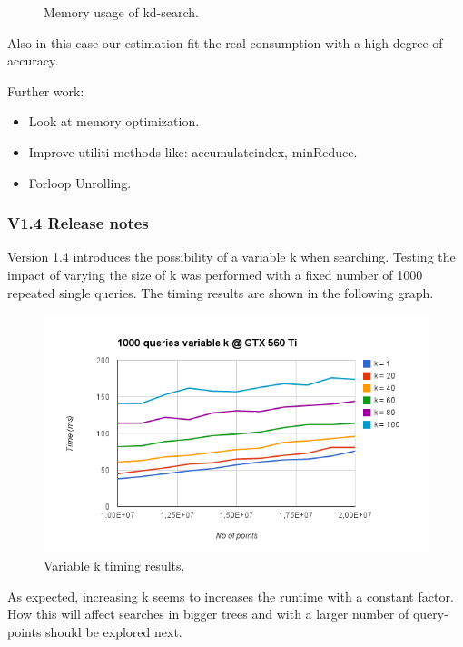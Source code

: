 \begin{enumerate}
\begin{enumerate}
\begin{figure}[ht!]
\caption{Memory usage of kd-search.}
\label{fig:memory-usage-kd-search}
\end{figure}

Also in this case our estimation fit the real consumption with a high degree of accuracy.

Further work:
\begin{itemize}
    \item Look at memory optimization.
    \item Improve utiliti methods like: accumulateindex, minReduce.
    \item Forloop Unrolling.
\end{itemize}


\subsubsection{V1.4 Release notes} %
\label{ssub:v14_release_notes}

Version 1.4 introduces the possibility of a variable k when searching. Testing the impact of varying the size of k was performed with a fixed number of 1000 repeated single queries. The timing results are shown in the following graph.

\begin{figure}[ht!]
\centering
\includegraphics[width=120mm]{gfx/v14_variable_k.png}

\caption{Variable k timing results.}
\label{fig:v14_variable_k}
\end{figure}

As expected, increasing k seems to increases the runtime with a constant factor. How this will affect searches in bigger trees and with a larger number of query-points should be explored next.


\end{enumerate}
\end{enumerate}
